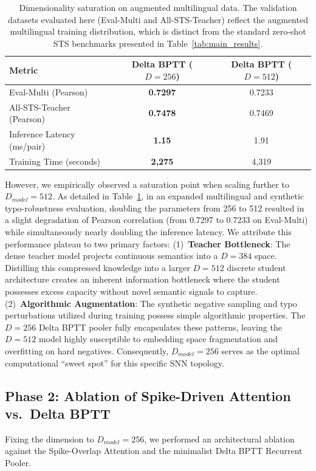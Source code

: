 \documentclass[10pt]{article} %
\begin{document}
\begin{table}[t!]
\caption{Dimensionality saturation on augmented multilingual data. The validation datasets evaluated here (Eval-Multi and All-STS-Teacher) reflect the augmented multilingual training distribution, which is distinct from the standard zero-shot STS benchmarks presented in Table~\ref{tab:main_results}.}
\label{tab:multilingual_saturation}
\begin{center}
\begin{tabular}{lcc}
\toprule
\textbf{Metric} & \textbf{Delta BPTT ($D{=}256$)} & \textbf{Delta BPTT ($D{=}512$)} \\
\midrule
Eval-Multi (Pearson) & \textbf{0.7297} & 0.7233 \\
All-STS-Teacher (Pearson) & \textbf{0.7478} & 0.7469 \\
Inference Latency (ms/pair) & \textbf{1.15} & 1.91 \\
Training Time (seconds) & \textbf{2,275} & 4,319 \\
\bottomrule
\end{tabular}
\end{center}
\end{table}

However, we empirically observed a saturation point when scaling further to $D_{model} = 512$. As detailed in Table~\ref{tab:multilingual_saturation}, in an expanded multilingual and synthetic typo-robustness evaluation, doubling the parameters from 256 to 512 resulted in a slight degradation of Pearson correlation (from 0.7297 to 0.7233 on Eval-Multi) while simultaneously nearly doubling the inference latency. We attribute this performance plateau to two primary factors: (1)~\textbf{Teacher Bottleneck}: The dense teacher model projects continuous semantics into a $D=384$ space. Distilling this compressed knowledge into a larger $D=512$ discrete student architecture creates an inherent information bottleneck where the student possesses excess capacity without novel semantic signals to capture. (2)~\textbf{Algorithmic Augmentation}: The synthetic negative sampling and typo perturbations utilized during training possess simple algorithmic properties. The $D=256$ Delta BPTT pooler fully encapsulates these patterns, leaving the $D=512$ model highly susceptible to embedding space fragmentation and overfitting on hard negatives. Consequently, $D_{model} = 256$ serves as the optimal computational ``sweet spot'' for this specific SNN topology.

\subsection{Phase 2: Ablation of Spike-Driven Attention vs.\ Delta BPTT}
Fixing the dimension to $D_{model} = 256$, we performed an architectural ablation against the Spike-Overlap Attention and the minimalist Delta BPTT Recurrent Pooler.
\end{document}
